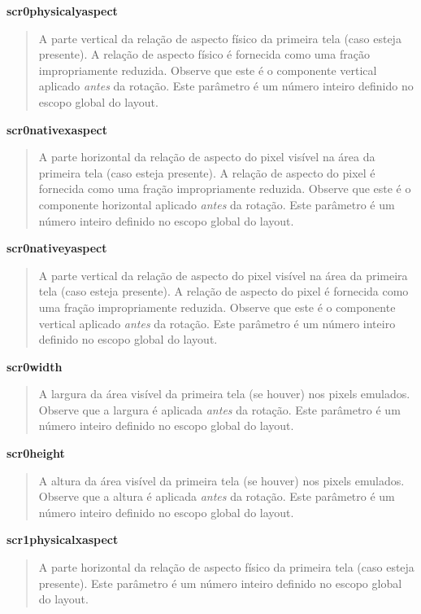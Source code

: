 \documentclass[letterpaper,10pt,brazil]{sphinxmanual}
\begin{document}
\textbf{scr0physicalyaspect}
\begin{quote}

A parte vertical da relação de aspecto físico da primeira tela
(caso esteja presente). A relação de aspecto físico é fornecida como
uma fração impropriamente reduzida. Observe que este é o componente
vertical aplicado \emph{antes} da rotação. Este parâmetro é um número
inteiro definido no escopo global do layout.
\end{quote}

\textbf{scr0nativexaspect}
\begin{quote}

A parte horizontal da relação de aspecto do pixel visível na área da
primeira tela (caso esteja presente). A relação de aspecto
do pixel é fornecida como uma fração impropriamente reduzida.
Observe que este é o componente horizontal aplicado \emph{antes} da
rotação. Este parâmetro é um número inteiro definido no escopo
global do layout.
\end{quote}

\textbf{scr0nativeyaspect}
\begin{quote}

A parte vertical da relação de aspecto do pixel visível na área da
primeira tela (caso esteja presente). A relação de aspecto do pixel
é fornecida como uma fração impropriamente reduzida. Observe que
este é o componente vertical aplicado \emph{antes} da rotação. Este
parâmetro é um número inteiro definido no escopo global do layout.
\end{quote}

\textbf{scr0width}
\begin{quote}

A largura da área visível da primeira tela (se houver) nos pixels
emulados. Observe que a largura é aplicada \emph{antes} da rotação.
Este parâmetro é um número inteiro definido no escopo global do
layout.
\end{quote}

\textbf{scr0height}
\begin{quote}

A altura da área visível da primeira tela (se houver) nos pixels
emulados. Observe que a altura é aplicada \emph{antes} da rotação.
Este parâmetro é um número inteiro definido no escopo global do
layout.
\end{quote}

\textbf{scr1physicalxaspect}
\begin{quote}

A parte horizontal da relação de aspecto físico da primeira tela
(caso esteja presente). Este parâmetro é um número inteiro definido
no escopo global do layout.
\end{quote}
\end{document}

